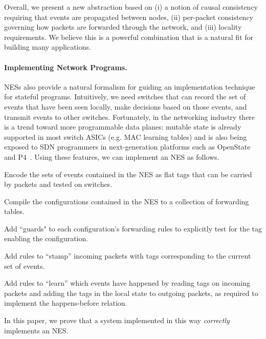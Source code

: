 \documentclass[pldi-cameraready]{sigplanconf}
\begin{document}
Overall, we present a new abstraction based on (i)
a notion of causal consistency requiring that events are
propagated between nodes, (ii) per-packet consistency governing
how packets are forwarded through the network, and (iii) locality
requirements. We believe this is a powerful combination that is a natural fit for building many applications.














\paragraph*{Implementing Network Programs.}
NESs also provide a natural formalism for guiding
an implementation technique for stateful programs. Intuitively, we need switches that can
record the set of events that have been seen locally, make decisions
based on those events, and transmit events to other
switches. Fortunately, in the networking industry there is a trend
toward more programmable data planes: mutable state is already
supported in most switch ASICs (e.g. MAC learning tables) and is also
being exposed to SDN programmers in next-generation platforms such as
OpenState~\cite{bianchi2014openstate} and
P4~\cite{bosshart2014p4}. Using these features, we can implement
an NES as follows.

\begin{compactenum}
 \item Encode the sets of events contained in the NES
   as flat tags that can be carried by packets and tested on
   switches.
\item Compile the configurations contained in the NES
  to a collection of forwarding tables.
\item Add ``guards" to each configuration's forwarding rules
  to explicitly test for the tag enabling the configuration.
\item Add rules to ``stamp'' incoming packets with tags corresponding
  to the current set of events.
\item Add rules to ``learn'' which events have happened by reading
  tags on incoming packets and adding the tags in the local state to
  outgoing packets, as required to implement the happens-before
  relation.
\end{compactenum}
In this paper, we prove that a system implemented
in this way {\em correctly} implements an NES.
\end{document}
